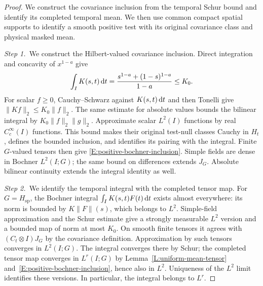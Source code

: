 \begin{proof}
  We construct the covariance inclusion from the temporal Schur bound and
  identify its completed temporal mean. We then use common compact spatial
  supports to identify a smooth positive test with its original covariance
  class and physical masked mean.


  \medskip
  \noindent\textit{Step 1.~}We construct the Hilbert-valued covariance
  inclusion.
  Direct integration and concavity of $x^{1-a}$ give
  \[
    \int_I K(s,t)\,\mathrm{d} t
    =\frac{s^{1-a}+(1-s)^{1-a}}{1-a}\le K_0 .
  \]
  For scalar $f \ge 0$, Cauchy--Schwarz against $K(s,t)\,\mathrm{d} t$ and then Tonelli
  give $\|Kf\|_2 \le K_0\|f\|_2$. The same estimate for absolute values bounds
  the bilinear integral by $K_0\|f\|_2\|g\|_2$. Approximate scalar $L^2(I)$
  functions by real $C_c^\infty(I)$ functions. This bound makes their original
  test-null classes Cauchy in $H_t$, defines the bounded inclusion, and
  identifies its pairing with the integral. Finite $G$-valued tensors then give
  \eqref{E:positive-bochner-inclusion}. Simple fields are dense in Bochner
  $L^2(I;G)$; the same bound on differences extends $J_G$. Absolute bilinear
  continuity extends the integral identity as well.


  \medskip
  \noindent\textit{Step 2.~}We identify the temporal integral with the
  completed tensor map.
  For $G = H_{\mathrm{sp}}$, the Bochner integral $\int_IK(s,t)F(t)\,\mathrm{d} t$ exists
  almost everywhere: its norm is bounded by $K\|F\|(s)$, which belongs to $L^2$.
  Simple-field approximation and the Schur estimate give a strongly measurable
  $L^2$ version and a bounded map of norm at most $K_0$. On smooth finite
  tensors it agrees with $(C_t\otimes I)J_G$ by the covariance definition.
  Approximation by such tensors converges in $L^2(I;G)$. The integral converges
  there by Schur; the completed tensor map converges in $L^r(I;G)$ by
  Lemma~\ref{L:uniform-mean-tensor} and~\eqref{E:positive-bochner-inclusion},
  hence also in $L^2$. Uniqueness of the $L^2$ limit identifies these versions.
  In particular, the integral belongs to $L^r$.



\end{proof}
